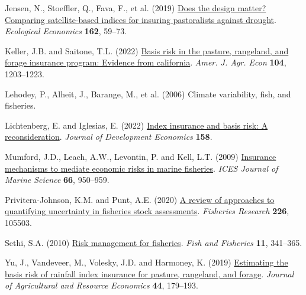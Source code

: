 \documentclass[
  letterpaper,
  DIV=11,
  numbers=noendperiod]{scrartcl}
\newlength{\cslhangindent}
\newlength{\cslentryspacingunit} %
\newenvironment{CSLReferences}[2] %
 {%
  \setlength{\parindent}{0pt}
  \ifodd #1
  \let\oldpar\par
  \def\par{\hangindent=\cslhangindent\oldpar}
  \fi
  \setlength{\parskip}{#2\cslentryspacingunit}
 }%
 {}
\begin{document}
\begin{CSLReferences}{1}{0}
\leavevmode{}%
Jensen, N., Stoeffler, Q., Fava, F., et al. (2019)
\href{https://doi.org/10.1016/J.ECOLECON.2019.04.014}{Does the design
matter? Comparing satellite-based indices for insuring pastoralists
against drought}. \emph{Ecological Economics} \textbf{162}, 59--73.

\leavevmode{}%
Keller, J.B. and Saitone, T.L. (2022)
\href{https://doi.org/10.1111/ajae.12282}{Basis risk in the pasture,
rangeland, and forage insurance program: Evidence from california}.
\emph{Amer. J. Agr. Econ} \textbf{104}, 1203--1223.

\leavevmode{}%
Lehodey, P., Alheit, J., Barange, M., et al. (2006) Climate variability,
fish, and fisheries.

\leavevmode{}%
Lichtenberg, E. and Iglesias, E. (2022)
\href{https://doi.org/10.1016/j.jdeveco.2022.102883}{Index insurance and
basis risk: A reconsideration}. \emph{Journal of Development Economics}
\textbf{158}.

\leavevmode{}%
Mumford, J.D., Leach, A.W., Levontin, P. and Kell, L.T. (2009)
\href{https://doi.org/10.1093/icesjms/fsp100}{Insurance mechanisms to
mediate economic risks in marine fisheries}. \emph{ICES Journal of
Marine Science} \textbf{66}, 950--959.

\leavevmode{}%
Privitera-Johnson, K.M. and Punt, A.E. (2020)
\href{https://doi.org/10.1016/j.fishres.2020.105503}{A review of
approaches to quantifying uncertainty in fisheries stock assessments}.
\emph{Fisheries Research} \textbf{226}, 105503.

\leavevmode{}%
Sethi, S.A. (2010)
\href{https://doi.org/10.1111/j.1467-2979.2010.00363.x}{Risk management
for fisheries}. \emph{Fish and Fisheries} \textbf{11}, 341--365.

\leavevmode{}%
Yu, J., Vandeveer, M., Volesky, J.D. and Harmoney, K. (2019)
\href{https://doi.org/10.22004/ag.econ.281319}{Estimating the basis risk
of rainfall index insurance for pasture, rangeland, and forage}.
\emph{Journal of Agricultural and Resource Economics} \textbf{44},
179--193.

\end{CSLReferences}
\end{document}
